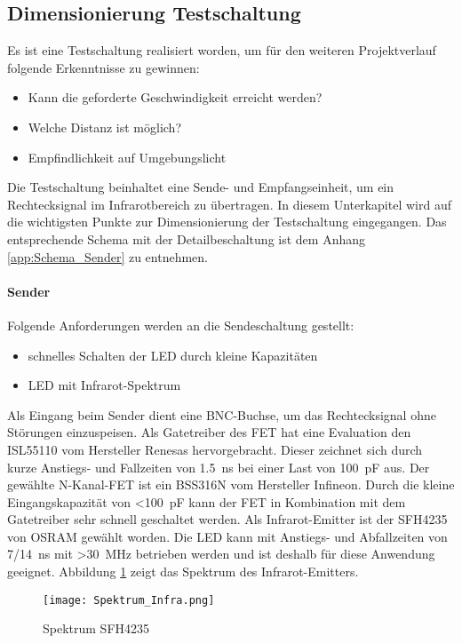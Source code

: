 \subsection{Dimensionierung Testschaltung}
Es ist eine Testschaltung realisiert worden, um für den weiteren Projektverlauf folgende Erkenntnisse zu gewinnen:
\begin{itemize}
	\item Kann die geforderte Geschwindigkeit erreicht werden?
	\item Welche Distanz ist möglich?
	\item Empfindlichkeit auf Umgebungslicht 
\end{itemize}
Die Testschaltung beinhaltet eine Sende- und Empfangseinheit, um ein Rechtecksignal im Infrarotbereich zu übertragen. 
In diesem Unterkapitel wird auf die wichtigsten Punkte zur Dimensionierung der Testschaltung eingegangen. Das entsprechende Schema mit der Detailbeschaltung ist dem Anhang \ref{app:Schema_Sender} zu entnehmen.
\paragraph{Sender} 
Folgende Anforderungen werden an die Sendeschaltung gestellt:
\begin{itemize}
	\item schnelles Schalten der LED durch kleine Kapazitäten
	\item LED mit Infrarot-Spektrum
\end{itemize}
Als Eingang beim Sender dient eine BNC-Buchse, um das Rechtecksignal ohne Störungen einzuspeisen. Als Gatetreiber des FET hat eine Evaluation den ISL55110 vom Hersteller Renesas hervorgebracht. Dieser zeichnet sich durch kurze Anstiegs- und Fallzeiten von \SI{1.5}{ns} bei einer Last von \SI{100}{pF} aus.
Der gewählte N-Kanal-FET ist ein BSS316N vom Hersteller Infineon. Durch die kleine Eingangskapazität von \textless \SI{100}{pF} kann der FET in Kombination mit dem Gatetreiber sehr schnell geschaltet werden.
Als Infrarot-Emitter ist der SFH4235 von OSRAM gewählt worden. Die LED kann mit Anstiegs- und Abfallzeiten von 7/\SI{14}{ns} mit \textgreater \SI{30}{MHz} betrieben werden und ist deshalb für diese Anwendung geeignet. Abbildung \ref{fig:Spektrum_Infra} zeigt das Spektrum des Infrarot-Emitters.

\begin{figure}[h]
	\centering
	\texttt{[image: Spektrum\_Infra.png]}
	\caption{Spektrum SFH4235 \cite{sfh4235}}\label{fig:Spektrum_Infra}
\end{figure}

